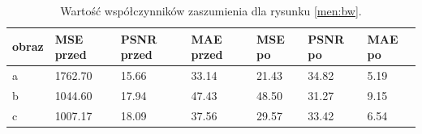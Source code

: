 \documentclass{classrep}
\begin{document}
\begin{table}[H]
	\begin{center}
		\begin{tabular}{|l|l|l|l|l|l|l|}
			\hline
			obraz & MSE przed & PSNR przed & MAE przed & MSE po & PSNR po & MAE po \\
			\hline
			a & 1762.70 & 15.66 & 33.14 & 21.43 & 34.82 & 5.19 \\
			b & 1044.60 & 17.94 & 47.43 & 48.50 & 31.27 & 9.15 \\
			c & 1007.17 & 18.09 & 37.56 & 29.57 & 33.42 & 6.54 \\
			\hline
		\end{tabular}
		\caption{Wartość współczynników zaszumienia dla rysunku \ref{men:bw}.}
			\label{mentabbw}
	\end{center}

\end{table}


\end{document}
